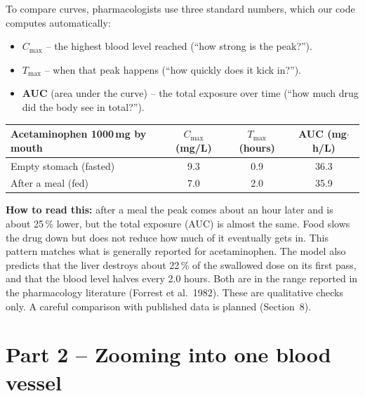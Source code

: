 \documentclass[10.5pt]{article}
\begin{document}
To compare curves, pharmacologists use three standard numbers, which our code computes automatically:
\begin{itemize}
\item \textbf{$C_{\max}$} -- the highest blood level reached (``how strong is the peak?'').
\item \textbf{$T_{\max}$} -- when that peak happens (``how quickly does it kick in?'').
\item \textbf{AUC} (area under the curve) -- the total exposure over time (``how much drug did the body see in total?'').
\end{itemize}

\begin{center}\small
\begin{tabular}{lccc}\toprule
Acetaminophen 1000\,mg by mouth & $C_{\max}$ (mg/L) & $T_{\max}$ (hours) & AUC (mg$\cdot$h/L)\\\midrule
Empty stomach (fasted) & 9.3 & 0.9 & 36.3\\
After a meal (fed) & 7.0 & 2.0 & 35.9\\\bottomrule
\end{tabular}
\end{center}

\textbf{How to read this:} after a meal the peak comes about an hour later and is about 25\,\% lower, but the
total exposure (AUC) is almost the same. Food slows the drug down but does not reduce how much of it eventually gets in.
This pattern matches what is generally reported for acetaminophen. The model also predicts that the liver destroys
about 22\,\% of the swallowed dose on its first pass, and that the blood level halves every 2.0 hours. Both are in the
range reported in the pharmacology literature (Forrest et al.\ 1982). These are qualitative checks only. A careful
comparison with published data is planned (Section~8).

\section{Part 2 -- Zooming into one blood vessel}
\end{document}
